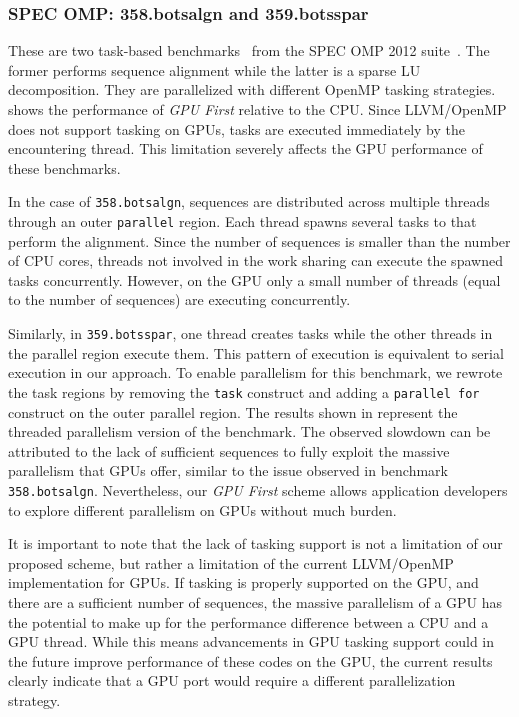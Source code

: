 \subsubsection{SPEC OMP: 358.botsalgn and 359.botsspar}
These are two task-based benchmarks~\cite{DBLP:conf/icpp/DuranTFMA09} from the SPEC OMP 2012 suite~\cite{DBLP:conf/iwomp/MullerBBFHHJMPRSWWK12}.
The former performs sequence alignment while the latter is a sparse LU decomposition.
They are parallelized with different OpenMP tasking strategies.
 shows the performance of \emph{GPU First} relative to the CPU.
Since LLVM/OpenMP does not support tasking on GPUs, tasks are executed immediately by the encountering thread.
This limitation severely affects the GPU performance of these benchmarks.

In the case of \texttt{358.botsalgn}, sequences are distributed across multiple threads through an outer \lstinline{parallel} region.
Each thread spawns several tasks to that perform the alignment.
Since the number of sequences is smaller than the number of CPU cores, threads not involved in the work sharing can execute the spawned tasks concurrently.
However, on the GPU only a small number of threads (equal to the number of sequences) are executing concurrently.

Similarly, in \lstinline{359.botsspar}, one thread creates tasks while the other threads in the parallel region execute them.
This pattern of execution is equivalent to serial execution in our approach.
To enable parallelism for this benchmark, we rewrote the task regions by removing the \lstinline{task} construct and adding a \lstinline{parallel for} construct on the outer parallel region.
The results shown in  represent the threaded parallelism version of the benchmark.
The observed slowdown can be attributed to the lack of sufficient sequences to fully exploit the massive parallelism that GPUs offer, similar to the issue observed in benchmark \texttt{358.botsalgn}.
Nevertheless, our \emph{GPU First} scheme allows application developers to explore different parallelism on GPUs without much burden.

It is important to note that the lack of tasking support is not a limitation of our proposed scheme, but rather a limitation of the current LLVM/OpenMP implementation for GPUs.
If tasking is properly supported on the GPU, and there are a sufficient number of sequences, the massive parallelism of a GPU has the potential to make up for the performance difference between a CPU and a GPU thread.
While this means advancements in GPU tasking support could in the future improve performance of these codes on the GPU, the current results clearly indicate that a GPU port would require a different parallelization strategy.

